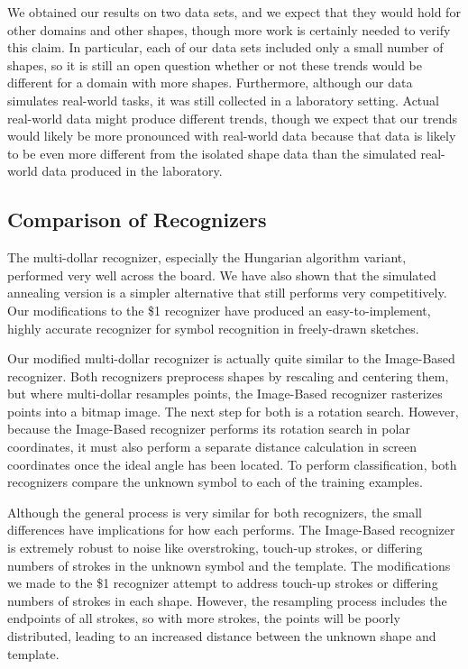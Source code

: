 \documentclass[final,5p,twocolumn]{elsarticle}
\begin{document}
We obtained our results on two data sets, and we expect that they would 
hold for other domains and other shapes, though more work is certainly needed to 
verify this claim.  In particular, each of our data sets included only a small number 
of shapes, so it is still an open question whether or not these trends would be 
different for a domain with more shapes.  Furthermore, although our data
simulates real-world tasks, it was still collected in a laboratory setting.
Actual real-world data might produce different trends, though we expect
that our trends would likely be more pronounced with real-world data
because that data is likely to be even more different from the isolated
shape data than the simulated 
real-world data produced in the laboratory.


\subsection{Comparison of Recognizers}
The multi-dollar recognizer, especially the Hungarian algorithm variant,
performed very well across the board.  We have also shown that the
simulated annealing version is a simpler alternative that still 
performs very competitively. Our modifications to the \$1 recognizer have
produced an easy-to-implement, highly accurate recognizer for symbol
recognition in freely-drawn sketches.

Our modified multi-dollar recognizer is actually quite similar to the
Image-Based recognizer. Both recognizers preprocess shapes by
rescaling and centering them, but where multi-dollar resamples points, the
Image-Based recognizer rasterizes points into a bitmap image. The next
step for both is a rotation search. However, because the Image-Based
recognizer performs its rotation search in polar coordinates, it must
also perform a separate distance calculation in screen coordinates
once the ideal angle has been located. To perform classification, both
recognizers compare the unknown symbol to each of the training
examples.

Although the general process is very similar for both recognizers, the
small differences have implications for how each performs. The
Image-Based recognizer is extremely robust to noise like overstroking,
touch-up strokes, or differing numbers of strokes in the unknown
symbol and the template. The modifications we made to the \$1
recognizer attempt to address touch-up strokes or differing numbers of
strokes in each shape. However, the resampling process includes the
endpoints of all strokes, so with more strokes, the points will be
poorly distributed, leading to an increased distance between the
unknown shape and template.
\end{document}

